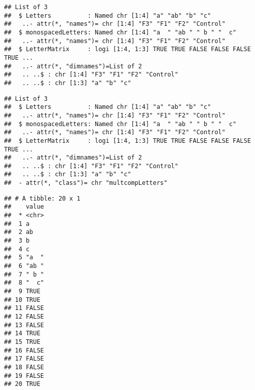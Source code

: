 \documentclass[]{book}
\newenvironment{Shaded}{\begin{snugshade}}{\end{snugshade}}
\newcommand{\DecValTok}[1]{\textcolor[rgb]{0.00,0.00,0.81}{#1}}
\newcommand{\KeywordTok}[1]{\textcolor[rgb]{0.13,0.29,0.53}{\textbf{#1}}}
\newcommand{\NormalTok}[1]{#1}
\newcommand{\OperatorTok}[1]{\textcolor[rgb]{0.81,0.36,0.00}{\textbf{#1}}}
\newcommand{\StringTok}[1]{\textcolor[rgb]{0.31,0.60,0.02}{#1}}
\theoremstyle{definition}
\theoremstyle{definition}
\theoremstyle{definition}
\theoremstyle{remark}
\begin{document}
\begin{verbatim}
## List of 3
##  $ Letters          : Named chr [1:4] "a" "ab" "b" "c"
##   ..- attr(*, "names")= chr [1:4] "F3" "F1" "F2" "Control"
##  $ monospacedLetters: Named chr [1:4] "a  " "ab " " b " "  c"
##   ..- attr(*, "names")= chr [1:4] "F3" "F1" "F2" "Control"
##  $ LetterMatrix     : logi [1:4, 1:3] TRUE TRUE FALSE FALSE FALSE TRUE ...
##   ..- attr(*, "dimnames")=List of 2
##   .. ..$ : chr [1:4] "F3" "F1" "F2" "Control"
##   .. ..$ : chr [1:3] "a" "b" "c"
\end{verbatim}

\begin{Shaded}
\end{Shaded}

\begin{verbatim}
## List of 3
##  $ Letters          : Named chr [1:4] "a" "ab" "b" "c"
##   ..- attr(*, "names")= chr [1:4] "F3" "F1" "F2" "Control"
##  $ monospacedLetters: Named chr [1:4] "a  " "ab " " b " "  c"
##   ..- attr(*, "names")= chr [1:4] "F3" "F1" "F2" "Control"
##  $ LetterMatrix     : logi [1:4, 1:3] TRUE TRUE FALSE FALSE FALSE TRUE ...
##   ..- attr(*, "dimnames")=List of 2
##   .. ..$ : chr [1:4] "F3" "F1" "F2" "Control"
##   .. ..$ : chr [1:3] "a" "b" "c"
##  - attr(*, "class")= chr "multcompLetters"
\end{verbatim}

\begin{Shaded}
\end{Shaded}

\begin{verbatim}
## # A tibble: 20 x 1
##    value
##  * <chr>
##  1 a    
##  2 ab   
##  3 b    
##  4 c    
##  5 "a  "
##  6 "ab "
##  7 " b "
##  8 "  c"
##  9 TRUE 
## 10 TRUE 
## 11 FALSE
## 12 FALSE
## 13 FALSE
## 14 TRUE 
## 15 TRUE 
## 16 FALSE
## 17 FALSE
## 18 FALSE
## 19 FALSE
## 20 TRUE
\end{verbatim}
\end{document}
